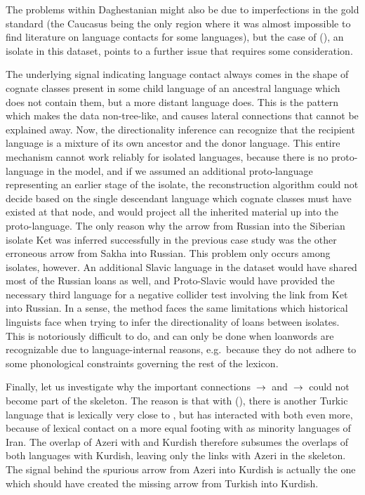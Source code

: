 The problems within Daghestanian might also be due to imperfections in the gold standard (the Caucasus being the only region where it was almost impossible to find literature on language contacts for some languages), but the case of  (), an isolate in this dataset, points to a further issue that requires some consideration.
 
The underlying signal indicating language contact always comes in the shape of cognate classes present in some child language of an ancestral language which does not contain them, but a more distant language does. This is the pattern which makes the data non-tree-like, and causes lateral connections that cannot be explained away. Now, the directionality inference can recognize that the recipient language is a mixture of its own ancestor and the donor language. This entire mechanism cannot work reliably for isolated languages, because there is no proto-language in the model, and if we assumed an additional proto-language representing an earlier stage of the isolate, the reconstruction algorithm could not decide based on the single descendant language which cognate classes must have existed at that node, and would project all the inherited material up into the proto-language. The only reason why the arrow from Russian into the Siberian isolate Ket was inferred successfully in the previous case study was the other erroneous arrow from Sakha into Russian. This problem only occurs among isolates, however. An additional Slavic language in the dataset would have shared most of the Russian loans as well, and Proto-Slavic would have provided the necessary third language for a negative collider test involving the link from Ket into Russian. In a sense, the method faces the same limitations which historical linguists face when trying to infer the directionality of loans between isolates. This is notoriously difficult to do, and can only be done when loanwords are recognizable due to language-internal reasons, e.g.\ because they do not adhere to some phonological constraints governing the rest of the lexicon.
 
Finally, let us investigate  why the important connections  $\kern 2pt\hbox{$\rightarrow$}\kern 2pt$  and  $\kern 2pt\hbox{$\rightarrow$}\kern 2pt$  could not become part of the skeleton. The reason is that with  (), there is another Turkic language that is lexically very close to , but has interacted with both  even more, because of lexical contact on a more equal footing with  as minority languages of Iran. The overlap of Azeri with  and Kurdish therefore subsumes the overlaps of both languages with Kurdish, leaving only the links with Azeri in the skeleton. The signal behind the spurious arrow from Azeri into Kurdish is actually the one which should have created the missing arrow from Turkish into Kurdish.
 
